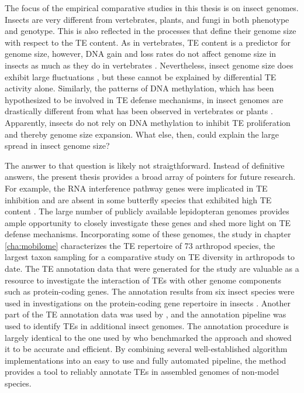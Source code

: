 The focus of the empirical comparative studies in this thesis is on
insect genomes. Insects are very different from vertebrates, plants, and
fungi in both phenotype and genotype. This is also reflected in the
processes that define their genome size with respect to the TE content.
As in vertebrates, TE content is a predictor for genome size, however,
DNA gain and loss rates do not affect genome size in insects as much as
they do in vertebrates \citep{Kapusta2017a, Lindblad-Toh2005}.
Nevertheless, insect genome size does exhibit large fluctuations
\citep{Alfsnes2017}, but these cannot be explained by differential TE
activity alone.  Similarly, the patterns of DNA methylation, which has
been hypothesized to be involved in TE defense mechanisms, in insect
genomes are drastically different from what has been observed in
vertebrates or plants \citep{Provataris2018, Suzuki2008}. Apparently,
insects do not rely on DNA methylation to inhibit TE proliferation and
thereby genome size expansion. What else, then, could explain the large
spread in insect genome size?

The answer to that question is likely not straigthforward. Instead of
definitive answers, the present thesis provides a broad array of
pointers for future research. For example, the RNA interference pathway
genes were implicated in TE inhibition \citep{Aravin2001, Czech2008} and
are absent in some butterfly species that exhibited high TE content
\citep{Dowling2017}. The large number of publicly available lepidopteran
genomes provides ample opportunity to closely investigate these genes
and shed more light on TE defense mechanisms. Incorporating some of
these genomes, the study in chapter \ref{cha:mobilome} characterizes the
TE repertoire of 73 arthropod species, the largest taxon sampling for a
comparative study on TE diversity in arthropods to date. The TE
annotation data that were generated for the study are valuable as a
resource to investigate the interaction of TEs with other genome
components such as protein-coding genes. The annotation results from six
insect species were used in
investigations on the protein-coding gene repertoire in insects
. Another part of the TE annotation data was
used by \citep{Provataris2018}, and the annotation pipeline was used to
identify TEs in additional insect genomes. The annotation procedure is
largely identical to the one used by \citet{Reinar2016} who benchmarked
the approach and showed it to be accurate and efficient. By combining
several well-established algorithm implementations into an easy to use
and fully automated pipeline, the method provides a tool to reliably
annotate TEs in assembled genomes of non-model species. 

